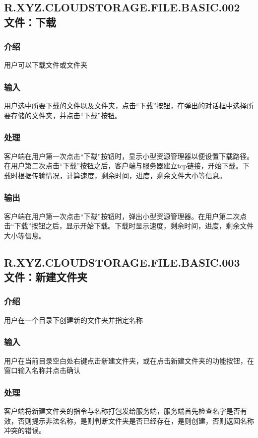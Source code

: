 \subsection{R.XYZ.CLOUDSTORAGE.FILE.BASIC.002 文件：下载}

\subsubsection{介绍}
用户可以下载文件或文件夹

\subsubsection{输入}
用户选中所要下载的文件以及文件夹，点击“下载”按钮，在弹出的对话框中选择所要存储的文件夹，并点击“下载”按钮。

\subsubsection{处理}
客户端在用户第一次点击“下载”按钮时，显示小型资源管理器以便设置下载路径。在用户第二次点击“下载”按钮之后，客户端与服务器建立tcp链接，开始下载。下载时根据传输情况，计算速度，剩余时间，进度，剩余文件大小等信息。

\subsubsection{输出}
客户端在用户第一次点击“下载”按钮时，弹出小型资源管理器。在用户第二次点击“下载”按钮之后，显示开始下载。下载时显示速度，剩余时间，进度，剩余文件大小等信息。

\subsection{R.XYZ.CLOUDSTORAGE.FILE.BASIC.003 文件：新建文件夹}

\subsubsection{介绍}
用户在一个目录下创建新的文件夹并指定名称

\subsubsection{输入} 
用户在当前目录空白处右键点击新建文件夹，或在点击新建文件夹的功能按钮，在窗口输入名称并点击确认

\subsubsection{处理} 
客户端将新建文件夹的指令与名称打包发给服务端，服务端首先检查名字是否有效，否则提示非法名称，是则判断文件夹是否已经存在，是则创建，否则返回名称冲突的错误。

